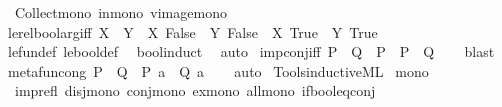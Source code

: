 \begin{isabellebody}
\ \ Collect{\isacharunderscore}{\kern0pt}mono\ in{\isacharunderscore}{\kern0pt}mono\ vimage{\isacharunderscore}{\kern0pt}mono\isanewline
\isanewline
{}\isamarkupfalse%
\ le{\isacharunderscore}{\kern0pt}rel{\isacharunderscore}{\kern0pt}bool{\isacharunderscore}{\kern0pt}arg{\isacharunderscore}{\kern0pt}iff{\isacharcolon}{\kern0pt}\ {\isachardoublequoteopen}X\ {\isasymle}\ Y\ {\isasymlongleftrightarrow}\ X\ False\ {\isasymle}\ Y\ False\ {\isasymand}\ X\ True\ {\isasymle}\ Y\ True{\isachardoublequoteclose}\isanewline
%
\isadelimproof
\ \ %
\endisadelimproof
%
\isatagproof
{}\isamarkupfalse%
\ le{\isacharunderscore}{\kern0pt}fun{\isacharunderscore}{\kern0pt}def\ le{\isacharunderscore}{\kern0pt}bool{\isacharunderscore}{\kern0pt}def\ \isamarkupfalse%
\ bool{\isacharunderscore}{\kern0pt}induct\ \isamarkupfalse%
\ auto%
\endisatagproof
{\isafoldproof}%
%
\isadelimproof
\isanewline
%
\endisadelimproof
\isanewline
{}\isamarkupfalse%
\ imp{\isacharunderscore}{\kern0pt}conj{\isacharunderscore}{\kern0pt}iff{\isacharcolon}{\kern0pt}\ {\isachardoublequoteopen}{\isacharparenleft}{\kern0pt}{\isacharparenleft}{\kern0pt}P\ {\isasymlongrightarrow}\ Q{\isacharparenright}{\kern0pt}\ {\isasymand}\ P{\isacharparenright}{\kern0pt}\ {\isacharequal}{\kern0pt}\ {\isacharparenleft}{\kern0pt}P\ {\isasymand}\ Q{\isacharparenright}{\kern0pt}{\isachardoublequoteclose}\isanewline
%
\isadelimproof
\ \ %
\endisadelimproof
%
\isatagproof
{}\isamarkupfalse%
\ blast%
\endisatagproof
{\isafoldproof}%
%
\isadelimproof
\isanewline
%
\endisadelimproof
\isanewline
{}\isamarkupfalse%
\ meta{\isacharunderscore}{\kern0pt}fun{\isacharunderscore}{\kern0pt}cong{\isacharcolon}{\kern0pt}\ {\isachardoublequoteopen}P\ {\isasymequiv}\ Q\ {\isasymLongrightarrow}\ P\ a\ {\isasymequiv}\ Q\ a{\isachardoublequoteclose}\isanewline
%
\isadelimproof
\ \ %
\endisadelimproof
%
\isatagproof
{}\isamarkupfalse%
\ auto%
\endisatagproof
{\isafoldproof}%
%
\isadelimproof
\isanewline
%
\endisadelimproof
%
\isadelimML
\isanewline
%
\endisadelimML
%
\isatagML
{}\isamarkupfalse%
\ {\isacartoucheopen}Tools{\isacharslash}{\kern0pt}inductive{\isachardot}{\kern0pt}ML{\isacartoucheclose}%
\endisatagML
{\isafoldML}%
%
\isadelimML
\isanewline
%
\endisadelimML
\isanewline
{}\isamarkupfalse%
\ {\isacharbrackleft}{\kern0pt}mono{\isacharbrackright}{\kern0pt}\ {\isacharequal}{\kern0pt}\isanewline
\ \ imp{\isacharunderscore}{\kern0pt}refl\ disj{\isacharunderscore}{\kern0pt}mono\ conj{\isacharunderscore}{\kern0pt}mono\ ex{\isacharunderscore}{\kern0pt}mono\ all{\isacharunderscore}{\kern0pt}mono\ if{\isacharunderscore}{\kern0pt}bool{\isacharunderscore}{\kern0pt}eq{\isacharunderscore}{\kern0pt}conj\isanewline

\end{isabellebody}
